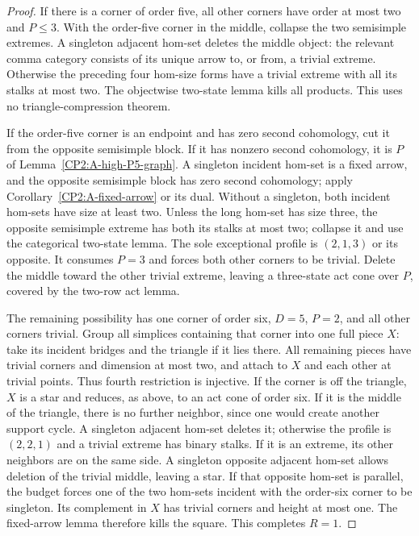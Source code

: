 \begin{proof}
If there is a corner of order five, all other corners
have order at most two and $P\leq3$.  With the order-five
corner in the middle, collapse the two semisimple extremes.
A singleton adjacent hom-set deletes the middle object:
the relevant comma category consists of its unique arrow
to, or from, a trivial extreme.  Otherwise the preceding
four hom-size forms have a trivial extreme with all its
stalks at most two.  The objectwise two-state lemma kills
all products.  This uses no triangle-compression theorem.

If the order-five corner is an endpoint and has zero
second cohomology, cut it from the opposite semisimple
block.  If it has nonzero second cohomology, it is $P$
of Lemma~\ref{CP2:A-high-P5-graph}.  A singleton incident
hom-set is a fixed arrow, and the opposite semisimple
block has zero second cohomology; apply
Corollary~\ref{CP2:A-fixed-arrow} or its dual.
Without a singleton, both incident hom-sets have size
at least two.  Unless the long hom-set has size three,
the opposite semisimple extreme has both its stalks at
most two; collapse it and use the categorical two-state
lemma.  The sole exceptional profile is $(2,1,3)$ or
its opposite.  It consumes $P=3$ and forces both other
corners to be trivial.  Delete the middle toward the
other trivial extreme, leaving a three-state act cone
over $P$, covered by the two-row act lemma.

The remaining possibility has one corner of order six,
$D=5$, $P=2$, and all other corners trivial.  Group all
simplices containing that corner into one full piece $X$:
take its incident bridges and the triangle if it lies
there.  All remaining pieces have trivial corners and
dimension at most two, and attach to $X$ and each other
at trivial points.  Thus fourth restriction is injective.
If the corner is off the triangle, $X$ is a star and
reduces, as above, to an act cone of order six.
If it is the middle of the triangle, there is no further
neighbor, since one would create another support cycle.
A singleton adjacent hom-set deletes it; otherwise the
profile is $(2,2,1)$ and a trivial extreme has binary
stalks.  If it is an extreme, its other neighbors are on
the same side.  A singleton opposite adjacent hom-set
allows deletion of the trivial middle, leaving a star.
If that opposite hom-set is parallel, the budget forces
one of the two hom-sets incident with the order-six corner
to be singleton.  Its complement in $X$ has trivial
corners and height at most one.  The fixed-arrow lemma
therefore kills the square.  This completes $R=1$.


\end{proof}
